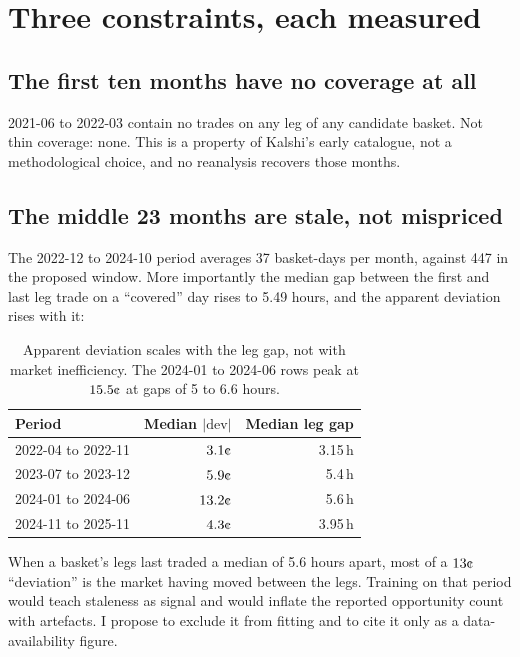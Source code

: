\documentclass[11pt,a4paper]{article}
\newcommand{\cent}{\text{\textcent}}
\begin{document}
\section{Three constraints, each measured}

\subsection{The first ten months have no coverage at all}

2021-06 to 2022-03 contain no trades on any leg of any candidate basket. Not
thin coverage: none. This is a property of Kalshi's early catalogue, not a
methodological choice, and no reanalysis recovers those months.

\subsection{The middle 23 months are stale, not mispriced}
\label{sec:stale}

The 2022-12 to 2024-10 period averages 37 basket-days per month, against 447
in the proposed window. More importantly the median gap between the first and
last leg trade on a ``covered'' day rises to 5.49 hours, and the apparent
deviation rises with it:

\begin{table}[ht]
\centering
\begin{tabular}{lrr}
\toprule
Period & Median $|\mathrm{dev}|$ & Median leg gap \\
\midrule
2022-04 to 2022-11 & $3.1\cent$ & 3.15\,h \\
2023-07 to 2023-12 & $5.9\cent$ & 5.4\,h \\
2024-01 to 2024-06 & $13.2\cent$ & 5.6\,h \\
2024-11 to 2025-11 & $4.3\cent$ & 3.95\,h \\
\bottomrule
\end{tabular}
\caption{Apparent deviation scales with the leg gap, not with market
inefficiency. The 2024-01 to 2024-06 rows peak at $15.5\cent$ at gaps of 5 to
6.6 hours.}
\end{table}

When a basket's legs last traded a median of 5.6 hours apart, most of a
$13\cent$ ``deviation'' is the market having moved between the legs. Training
on that period would teach staleness as signal and would inflate the
reported opportunity count with artefacts. I propose to exclude it from
fitting and to cite it only as a data-availability figure.
\end{document}

